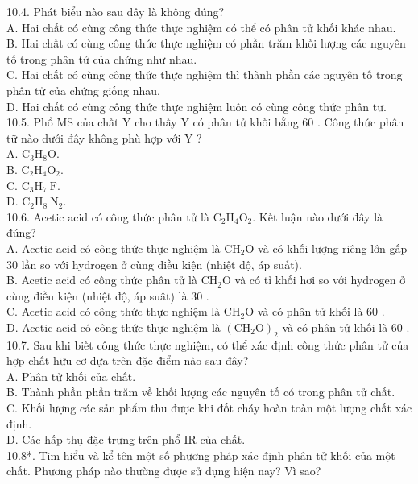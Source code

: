 \documentclass[10pt]{article}
\begin{document}
10.4. Phát biểu nào sau đây là không đúng?\\
A. Hai chất có cùng công thức thực nghiệm có thể có phân tử khối khác nhau.\\
B. Hai chất có cùng công thức thực nghiệm có phần trăm khối lượng các nguyên tố trong phân tử của chứng như nhau.\\
C. Hai chất có cùng công thức thực nghiệm thì thành phần các nguyên tố trong phân tử của chứng giống nhau.\\
D. Hai chất có cùng công thức thực nghiệm luôn có cùng công thức phân tư.\\
10.5. Phổ MS của chất Y cho thấy Y có phân tử khối bằng 60 . Công thức phân tữ nào dưới đây không phù hợp với Y ?\\
A. $\mathrm{C}_{3} \mathrm{H}_{8} \mathrm{O}$.\\
B. $\mathrm{C}_{2} \mathrm{H}_{4} \mathrm{O}_{2}$.\\
C. $\mathrm{C}_{3} \mathrm{H}_{7} \mathrm{~F}$.\\
D. $\mathrm{C}_{2} \mathrm{H}_{8} \mathrm{~N}_{2}$.\\
10.6. Acetic acid có công thức phân tử là $\mathrm{C}_{2} \mathrm{H}_{4} \mathrm{O}_{2}$. Kết luận nào dưới đây là đúng?\\
A. Acetic acid có công thức thực nghiệm là $\mathrm{CH}_{2} \mathrm{O}$ và có khối lượng riêng lớn gấp 30 lần so với hydrogen ở cùng điều kiện (nhiệt độ, áp suất).\\
B. Acetic acid có công thức phân tử là $\mathrm{CH}_{2} \mathrm{O}$ và có tỉ khối hơi so với hydrogen ở cùng điều kiện (nhiệt độ, áp suât) là 30 .\\
C. Acetic acid có công thức thực nghiệm là $\mathrm{CH}_{2} \mathrm{O}$ và có phân tử khối là 60 .\\
D. Acetic acid có công thức thực nghiệm là $\left(\mathrm{CH}_{2} \mathrm{O}\right)_{2}$ và có phân tử khối là 60 .\\
10.7. Sau khi biết công thức thực nghiệm, có thể xác định công thức phân tử của hợp chất hữu cơ dựa trên đặc điểm nào sau đây?\\
A. Phân tử khối của chất.\\
B. Thành phần phần trăm về khối lượng các nguyên tố có trong phân tử chất.\\
C. Khối lượng các sản phẩm thu được khi đốt cháy hoàn toàn một lượng chất xác định.\\
D. Các hấp thụ đặc trưng trên phổ IR của chất.\\
10.8*. Tìm hiểu và kể tên một số phương pháp xác định phân tử khối của một chất. Phương pháp nào thường được sử dụng hiện nay? Vì sao?\\
\end{document}
